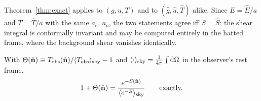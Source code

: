 \begin{remark}
Theorem~\ref{thm:exact} applies to $(g,u,T)$ and to $(\hat g,\hat u,\hat T)$ alike.  Since $E=\hat E/a$ and
$T=\hat T/a$ with the same $a_e$, $a_o$, the two statements agree iff $S=\hat S$: the shear integral is
conformally invariant and may be computed entirely in the hatted frame, where the background shear
vanishes identically.
\end{remark}

\begin{corollary}\label{cor:theta}
With $\Theta(\hat{\mathbf n})\equiv T_{\rm obs}(\hat{\mathbf n})/\langle T_{\rm obs}\rangle_{\rm sky}-1$ and $\langle \cdot\rangle_{\rm sky}=\tfrac1{4\pi}\int\mathrm d\Omega$ in the
observer's rest frame,
\begin{equation}
1+\Theta(\hat{\mathbf n})=\frac{e^{-S(\hat{\mathbf n})}}{\langle e^{-S}\rangle_{\rm sky}}\qquad\text{exactly.}
\label{eq:theta_exact}
\end{equation}
\end{corollary}

